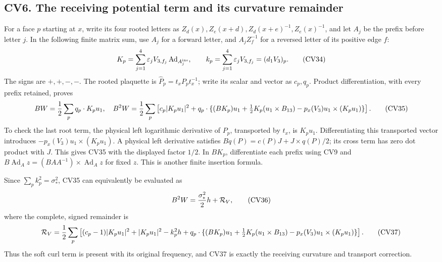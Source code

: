 \documentclass[11pt]{article}
\begin{document}
\subsection*{CV6. The receiving potential term and its curvature remainder}

For a face \(p\) starting at \(x\), write its four rooted letters as
\(Z_d(x),Z_e(x+d),Z_d(x+e)^{-1},Z_e(x)^{-1}\), and let \(A_j\)
be the prefix before letter \(j\). In the following finite matrix sum,
use \(A_j\) for a forward letter, and \(A_jZ_f^{-1}\) for a reversed
letter of its positive edge \(f\):
\[
 K_p=\sum_{j=1}^4 \varepsilon_j V_{3,f_j}
                   \operatorname{Ad}_{A_j^{\rm ins}},\qquad
 k_p=\sum_{j=1}^4\varepsilon_jV_{3,f_j}=(d_1V_3)_p.
                                                               \tag{CV34}
\]
The signs are \(+,+,-,-\). The rooted plaquette is
\(\widehat P_p=t_xP_pt_x^{-1}\); write its scalar and vector as
\(c_p,q_p\). Product differentiation, with every prefix retained,
proves
\[
 BW={1\over2}\sum_pq_p\cdot K_pu_1,
 \quad B^2W={1\over2}\sum_p
 \left[c_p|K_pu_1|^2+q_p\cdot
 \{(BK_p)u_1+\tfrac12K_p(u_1\times B_{13})
                 -p_x(V_3)u_1\times(K_pu_1)\}\right].   \tag{CV35}
\]
To check the last root term, the physical left logarithmic derivative
of \(P_p\), transported by \(t_x\), is \(K_pu_1\). Differentiating
this transported vector introduces
\(-p_x(V_3)u_1\times(K_pu_1)\). A physical left derivative satisfies
\(Bq(P)=c(P)J+J\times q(P)/2\); its cross term has zero dot product
with \(J\). This gives CV35 with the displayed factor \(1/2\).
In \(BK_p\), differentiate each prefix using CV9 and
\(B\operatorname{Ad}_A z=(BAA^{-1})\times\operatorname{Ad}_A z\)
for fixed \(z\). This is another finite insertion formula.

Since \(\sum_pk_p^2=\sigma_*^2\), CV35 can equivalently be evaluated as
\[
 B^2W={\sigma_*^2\over2}h+\mathcal R_V,                 \tag{CV36}
\]
where the complete, signed remainder is
\[
 \mathcal R_V={1\over2}\sum_p\left[
 (c_p-1)|K_pu_1|^2+|K_pu_1|^2-k_p^2h
 +q_p\cdot\{(BK_p)u_1+\tfrac12K_p(u_1\times B_{13})
                      -p_x(V_3)u_1\times(K_pu_1)\}\right].
                                                               \tag{CV37}
\]
Thus the soft curl term is present with its original frequency, and
CV37 is exactly the receiving curvature and transport correction.
\end{document}
